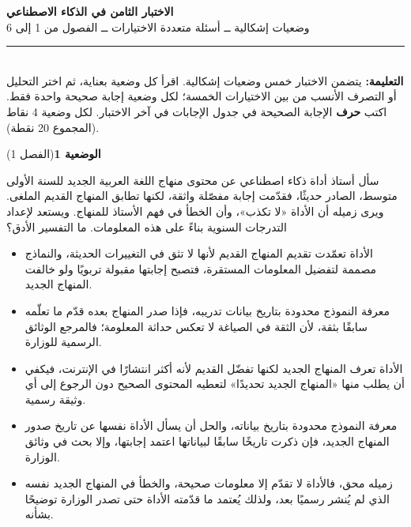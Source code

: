 \documentclass[11pt,a4paper]{article}
\begin{document}
\linespread{1.08}\selectfont
\begin{center}
{\LARGE\khatt\textbf{الاختبار الثامن في الذكاء الاصطناعي}}\\[4pt]
{\normalsize وضعيات إشكالية ــ أسئلة متعددة الاختيارات ــ الفصول من 1 إلى 6}
\end{center}
\vspace{-2pt}\rule{\textwidth}{0.6pt}\\[2pt]
\textbf{التعليمة:} يتضمن الاختبار خمس وضعيات إشكالية. اقرأ كل وضعية بعناية، ثم اختر التحليل أو التصرف الأنسب
من بين الاختيارات الخمسة؛ لكل وضعية إجابة صحيحة واحدة فقط.
اكتب \textbf{حرف} الإجابة الصحيحة في جدول الإجابات في آخر الاختبار.
لكل وضعية 4 نقاط (المجموع 20 نقطة).
\vspace{4pt}

\noindent
{\large\khatt\textbf{الوضعية 1}}\hfill{\small(الفصل 1)}\par\nopagebreak\vspace{3pt}
\setlength{\fboxsep}{7pt}\colorbox{gray!10}{\parbox{\dimexpr\linewidth-14pt}{سأل أستاذ أداة ذكاء اصطناعي عن محتوى منهاج اللغة العربية الجديد للسنة الأولى متوسط، الصادر حديثًا، فقدّمت إجابة مفصّلة واثقة، لكنها تطابق المنهاج القديم الملغى. ويرى زميله أن الأداة «لا تكذب»، وأن الخطأ في فهم الأستاذ للمنهاج. ويستعد لإعداد التدرجات السنوية بناءً على هذه المعلومات. ما التفسير الأدق؟}}\par\nopagebreak
\begin{itemize}[leftmargin=1.0cm, labelsep=6pt, itemsep=3pt, topsep=4pt, parsep=0pt]
  \item[\textbf{أ)}] الأداة تعمّدت تقديم المنهاج القديم لأنها لا تثق في التغييرات الحديثة، والنماذج مصممة لتفضيل المعلومات المستقرة، فتصبح إجابتها مقبولة تربويًا ولو خالفت المنهاج الجديد.
  \item[\textbf{ب)}] معرفة النموذج محدودة بتاريخ بيانات تدريبه، فإذا صدر المنهاج بعده قدّم ما تعلّمه سابقًا بثقة، لأن الثقة في الصياغة لا تعكس حداثة المعلومة؛ فالمرجع الوثائق الرسمية للوزارة.
  \item[\textbf{ج)}] الأداة تعرف المنهاج الجديد لكنها تفضّل القديم لأنه أكثر انتشارًا في الإنترنت، فيكفي أن يطلب منها «المنهاج الجديد تحديدًا» لتعطيه المحتوى الصحيح دون الرجوع إلى أي وثيقة رسمية.
  \item[\textbf{د)}] معرفة النموذج محدودة بتاريخ بياناته، والحل أن يسأل الأداة نفسها عن تاريخ صدور المنهاج الجديد، فإن ذكرت تاريخًا سابقًا لبياناتها اعتمد إجابتها، وإلا بحث في وثائق الوزارة.
  \item[\textbf{هـ)}] زميله محق، فالأداة لا تقدّم إلا معلومات صحيحة، والخطأ في المنهاج الجديد نفسه الذي لم يُنشر رسميًا بعد، ولذلك يُعتمد ما قدّمته الأداة حتى تصدر الوزارة توضيحًا بشأنه.
\end{itemize}
\end{document}
